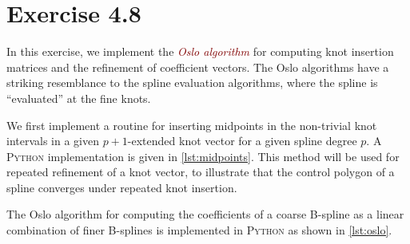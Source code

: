 \documentclass{article}
\let\oldemph\emph
\renewcommand{\emph}[1]{\textcolor{Maroon}{\oldemph{#1}}}
\begin{document}
    \section*{Exercise 4.8}
    In this exercise, we implement the \emph{Oslo algorithm} for computing knot
    insertion matrices and the refinement of coefficient vectors. The Oslo
    algorithms have a striking resemblance to the spline evaluation algorithms,
    where the spline is ``evaluated'' at the fine knots.

    We first implement a routine for inserting midpoints in the non-trivial
    knot intervals in a given $p+1$-extended knot vector for a given spline
    degree $p$. A \textsc{Python} implementation is given in
    \cref{lst:midpoints}. This method will be used for repeated refinement of
    a knot vector, to illustrate that the control polygon of a spline converges
    under repeated knot insertion.
    
    The Oslo algorithm for computing the coefficients of a coarse B-spline as a
    linear combination of finer B-splines is implemented in \textsc{Python} as
    shown in \cref{lst:oslo}.
\end{document}
